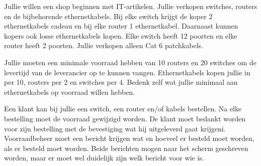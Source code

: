 Jullie willen een shop beginnen met IT-artikelen. Jullie verkopen switches, routers en de bijbehorende ethernetkabels. Bij elke switch krijgt de koper 2 ethernetkabels cadeau en bij elke router 1 ethernetkabel. Daarnaast kunnen kopers ook losse ethernetkabels kopen. Elke switch heeft 12 poorten en elke router heeft 2 poorten. Jullie verkopen alleen Cat 6 patchkabels.

Jullie moeten een minimale voorraad hebben van 10 routers en 20 switches om de levertijd van de leverancier op te kunnen vangen. Ethernetkabels kopen jullie in per 10, routers per 2 en switches per 4. Bedenk zelf wat jullie minimaal aan ethernetkabels op voorraad willen hebben.

Een klant kan bij jullie een switch, een router en/of kabels bestellen. Na elke bestelling moet de voorraad gewijzigd worden. De klant moet bedankt worden voor zijn bestelling met de bevestiging wat hij uitgeleverd gaat krijgeni. Voorraadbeheer moet een bericht krijgen wat en hoeveel er besteld moet worden, als er besteld moet worden. Beide berichten mogen naar het scherm geschreven worden, maar er moet wel duidelijk zijn welk bericht voor wie is.
